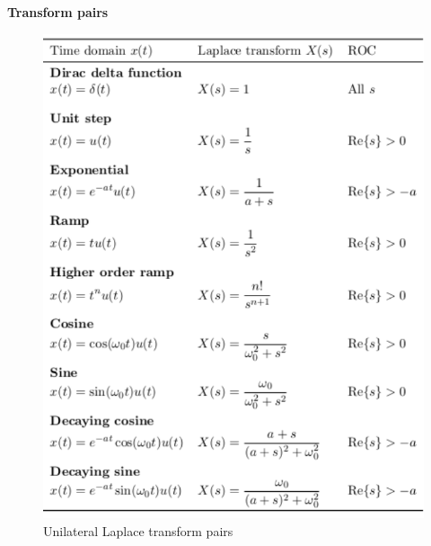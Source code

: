 \documentclass{article}
\begin{document}
\newpage
\textbf{Transform pairs}
\begin{figure}[!h]
    \centering
    \includegraphics[width=12cm]{image/unilateral-Laplace-transform-pairs.pdf}
    \caption{Unilateral Laplace transform pairs}
\end{figure}

\newpage
\end{document}
